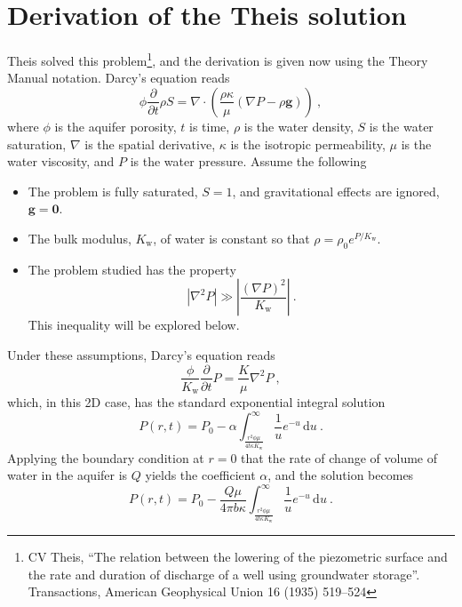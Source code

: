 \documentclass[]{scrreprt}
\begin{document}
\section{Derivation of the Theis solution}

Theis solved this problem\footnote{CV Theis, ``The relation between
  the lowering of the piezometric surface and the rate and duration of
  discharge of a well using groundwater storage''.  Transactions,
  American Geophysical Union 16 (1935) 519--524}, and the derivation
is given now using the Theory Manual notation.  Darcy's equation reads
\begin{equation}
\phi \frac{\partial}{\partial t} \rho S = \nabla\cdot \left(\frac{\rho
  \kappa}{\mu} (\nabla P - \rho {\mathbf{g}}) \right) \ ,
\end{equation}
where $\phi$ is the aquifer porosity, $t$ is time, $\rho$ is the water
density, $S$ is the water saturation, $\nabla$ is the spatial
derivative, $\kappa$ is the isotropic permeability, $\mu$ is the water
viscosity, and $P$ is the water pressure.  Assume the following
\begin{itemize}
\item The problem is fully saturated, $S=1$, and gravitational
  effects are ignored, ${\mathbf{g}} = {\mathbf{0}}$.
\item The bulk modulus, $K_{\mathrm{w}}$, of water is constant so that
  $\rho = \rho_{0}e^{P/K_{\mathrm{w}}}$.
\item The problem studied has the property
\begin{equation}
\left| \nabla^{2}P \right| \gg \left|\frac{(\nabla
  P)^{2}}{K_{\mathrm{w}}} \right|  \ .
\label{assumption.eqn}
\end{equation}
This inequality will be explored below.
\end{itemize}
\noindent Under these assumptions, Darcy's equation reads
\begin{equation}
\frac{\phi}{K_{\mathrm{w}}} \frac{\partial}{\partial t}P =
\frac{K}{\mu}\nabla^{2}P \ ,
\end{equation}
which, in this 2D case, has the standard exponential integral solution
\begin{equation}
P(r,t) = P_{0} - \alpha \int_{\frac{r^{2}\phi\mu}{4 t \kappa
    K_{\mathrm{w}}}}^{\infty} \frac{1}{u} e^{-u}\,\mathrm{d} u \ .
\end{equation}
Applying the boundary condition at $r=0$ that the rate of change of
volume of water in the aquifer is $Q$ yields the coefficient $\alpha$,
and the solution becomes
\begin{equation}
P(r,t) = P_{0} - \frac{Q\mu}{4\pi b \kappa} \int_{\frac{r^{2}\phi\mu}{4 t \kappa
    K_{\mathrm{w}}}}^{\infty} \frac{1}{u} e^{-u}\,\mathrm{d} u \ .
\label{eqn.theis}
\end{equation}
\end{document}
